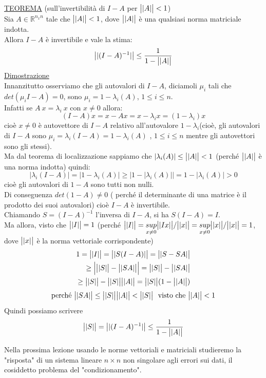 \documentclass[12pt,a4paper]{article}
\DeclarePairedDelimiter{\normaA}{\big | |}{|  \big |}
\begin{document}
\underline{TEOREMA} (sull'invertibilità di $I-A$ per $\normaA{A}<1$)\\
Sia $A \in \mathbb{R}^{n_x n}$ tale che $\normaA{A}<1$, dove $\normaA{A}$ è una qualsiasi norma matriciale indotta.\\
Allora $I-A$ è invertibile e vale la stima:
\begin{equation*}
    \normaA{(I-A)^{-1}}\leq \frac{1}{1-\normaA{A}}
\end{equation*}
\underline{Dimostrazione}\\
Innanzitutto osserviamo che gli autovalori di $I-A$, diciamoli $\mu_i$ tali che $det(\mu_iI-A)=0$,
sono $ \mu_i = 1 - \lambda_i (A)$, $1 \leq i \leq n$.\\
Infatti se $ A\ x = \lambda_i\ x$ con $x \neq 0$ allora:
\begin{equation*}
    (I-A)x = x-A x = x - \lambda_i x = (1- \lambda_i) x
\end{equation*}
cioè $x\neq 0$ è autovettore di $I-A$ relativo all'autovalore $1-\lambda_i$(cioè, gli autovalori di $I-A$ sono $\mu_i=\lambda_i(I-A)=1-\lambda_i(A)$ , $1\leq i \leq n$ mentre gli autovettori sono gli stessi).\\
Ma dal teorema di localizzazione sappiamo che $|\lambda_i(A)|\leq \normaA{ A }< 1$ (perché $\normaA{ A }$ è una norma indotta) quindi:
\begin{equation*}
    | \lambda_i(I-A) | = | 1-\lambda_i(A) | \geq \big | 1-|\lambda_i(A)| \big | = 1 - | \lambda_i(A) | > 0
\end{equation*}
cioè gli autovalori di $1-A$ sono tutti non nulli. \\
Di conseguenza $det(1-A)\neq 0$ ( perché il determinante di una matrice è il prodotto dei suoi autovalori) cioè $I-A$ è invertibile.\\
Chiamando $S = (I-A)^{-1}$ l'inversa di $I-A$, si ha $S(I-A) = I$. \\ Ma allora, visto che $\normaA{I} = 1$ (perché $\normaA{I} = \underset{x \neq 0}{sup}\normaA{Ix}/\normaA{x} =\underset{x \neq 0}{sup}\normaA{x}/\normaA{x} = 1 $, dove $\normaA{x}$ è la norma vettoriale corrispondente)
\begin{equation*}
\begin{split}
1 =  \normaA{I} = \normaA{S(I-A)} = \normaA{S-SA} \\ 
    \geq \Big | \normaA{S} - \normaA{SA} \Big | = \normaA{S} - \normaA{SA} \\
    \geq \normaA{S} - \normaA{S} \normaA{A} = \normaA{S} (1-\normaA{A})
\end{split}
\end{equation*}
\begin{equation*}
    \text{perché} \  \normaA{SA} \leq \normaA{S} \normaA{A} < \normaA{S}\ \text{ visto che} \  \normaA{A} < 1\\
\end{equation*}
Quindi possiamo scrivere
\begin{equation*}
    \normaA{S} = \normaA{(I-A)^{-1}} \leq \frac{1}{1-\normaA{A}}
\end{equation*}

Nella prossima lezione usando le norme vettoriali e matriciali studieremo la "risposta" di un sistema lineare $n \times n$ non singolare agli errori sui dati, il cosiddetto problema del "condizionamento".
\end{document}
